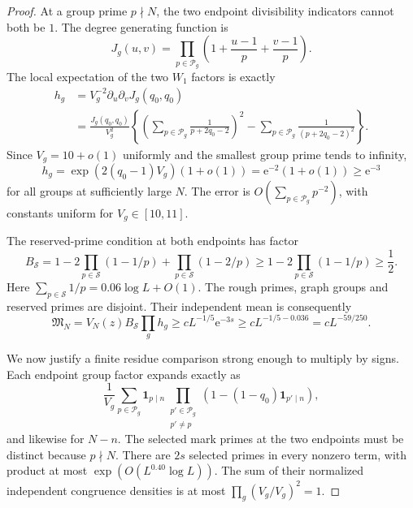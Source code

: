 \documentclass[11pt]{article}
\theoremstyle{definition}
\newcommand{\ind}{\mathbf 1}
\newcommand{\Pset}{\mathcal P}
\newcommand{\Sset}{\mathcal S}
\theoremstyle{remark}
\begin{document}
\begin{proof}
At a group prime $p\nmid N$, the two endpoint divisibility indicators
cannot both be $1$. The degree generating function is
\begin{equation}\label{eq:group-generating}
J_g(u,v)=\prod_{p\in\Pset_g}
            \left(1+\frac{u-1}{p}+\frac{v-1}{p}\right).
\end{equation}
The local expectation of the two $W_1$ factors is exactly
\begin{equation}\label{eq:group-local-mass}
\begin{split}
h_g&=V_g^{-2}\partial_u\partial_vJ_g(q_0,q_0)\\
&=\frac{J_g(q_0,q_0)}{V_g^2}
 \left\{\left(\sum_{p\in\Pset_g}\frac1{p+2q_0-2}\right)^2
       -\sum_{p\in\Pset_g}\frac1{(p+2q_0-2)^2}\right\}.
\end{split}
\end{equation}
Since $V_g=10+o(1)$ uniformly and the smallest group prime tends
to infinity,
\begin{equation}\label{eq:group-mass-asymptotic}
h_g=\exp(2(q_0-1)V_g)(1+o(1))
=\mathrm e^{-2}(1+o(1))\ge\mathrm e^{-3}
\end{equation}
for all groups at sufficiently large $N$.
The error is $O(\sum_{p\in\Pset_g}p^{-2})$, with constants uniform
for $V_g\in[10,11]$.

The reserved-prime condition at both endpoints has factor
\begin{equation}\label{eq:reserved-mass}
B_{\Sset}=1-2\prod_{p\in\Sset}(1-1/p)+\prod_{p\in\Sset}(1-2/p)
\ge1-2\prod_{p\in\Sset}(1-1/p)\ge\frac12.
\end{equation}
Here $\sum_{p\in\Sset}1/p=0.06\log L+O(1)$.
The rough primes, graph groups and reserved primes are disjoint.
Their independent mean is consequently
\begin{equation}\label{eq:independent-mass}
\mathfrak M_N=V_N(z)B_{\Sset}\prod_gh_g
\ge cL^{-1/5}\mathrm e^{-3s}
\ge cL^{-1/5-0.036}=cL^{-59/250}.
\end{equation}

We now justify a finite residue comparison strong enough to multiply
by signs. Each endpoint group factor expands exactly as
\begin{equation}\label{eq:local-residue-expansion}
\frac1{V_g}\sum_{p\in\Pset_g}\ind_{p\mid n}
 \prod_{\substack{p'\in\Pset_g\\p'\ne p}}
       (1-(1-q_0)\ind_{p'\mid n}),
\end{equation}
and likewise for $N-n$. The selected mark primes at the two
endpoints must be distinct because $p\nmid N$.
There are $2s$ selected primes in every nonzero term, with product
at most $\exp(O(L^{0.40}\log L))$.
The sum of their normalized independent congruence densities is at
most $\prod_g(V_g/V_g)^2=1$.


\end{proof}
\end{document}
